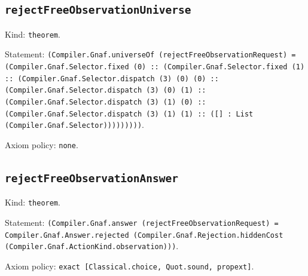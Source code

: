 \documentclass[11pt]{article}
\begin{document}
\subsection*{\texttt{rejectFreeObservationUniverse}}
\noindent Kind: \texttt{theorem}.\par
\noindent Statement: \texttt{(Compiler.Gnaf.universeOf (rejectFreeObservationRequest) = (Compiler.Gnaf.Selector.fixed (0) :: (Compiler.Gnaf.Selector.fixed (1) :: (Compiler.Gnaf.Selector.dispatch (3) (0) (0) :: (Compiler.Gnaf.Selector.dispatch (3) (0) (1) :: (Compiler.Gnaf.Selector.dispatch (3) (1) (0) :: (Compiler.Gnaf.Selector.dispatch (3) (1) (1) :: ([] : List (Compiler.Gnaf.Selector)))))))))}.\par
\noindent Axiom policy: \texttt{none}.\par
\subsection*{\texttt{rejectFreeObservationAnswer}}
\noindent Kind: \texttt{theorem}.\par
\noindent Statement: \texttt{(Compiler.Gnaf.answer (rejectFreeObservationRequest) = Compiler.Gnaf.Answer.rejected (Compiler.Gnaf.Rejection.hiddenCost (Compiler.Gnaf.ActionKind.observation)))}.\par
\noindent Axiom policy: \texttt{exact [Classical.choice, Quot.sound, propext]}.\par
\end{document}
